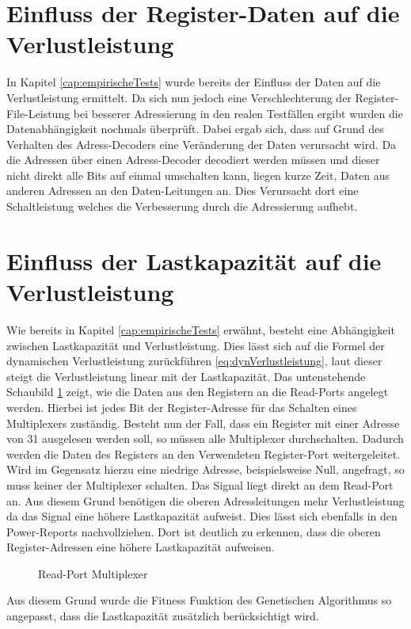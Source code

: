  


\section{Einfluss der Register-Daten auf die Verlustleistung}
In Kapitel \ref{cap:empirischeTests} wurde bereits der Einfluss der Daten auf die Verlustleistung ermittelt. Da sich nun jedoch eine Verschlechterung der Register-File-Leistung bei besserer Adressierung in den realen Testfällen ergibt wurden die Datenabhängigkeit nochmals überprüft. Dabei ergab sich, dass auf Grund des Verhalten des Adress-Decoders eine Veränderung der Daten verursacht wird. Da die Adressen über einen Adress-Decoder decodiert werden müssen und dieser nicht direkt alle Bits auf einmal umschalten kann, liegen kurze Zeit, Daten aus anderen Adressen an den Daten-Leitungen an. Dies Verursacht dort eine Schaltleistung welches die Verbesserung durch die Adressierung aufhebt.
%

\section{Einfluss der Lastkapazität  auf die Verlustleistung}
 \label{cap:lastkapa}
Wie bereits in Kapitel \ref{cap:empirischeTests} erwähnt, besteht eine Abhängigkeit zwischen Lastkapazität und Verlustleistung. Dies lässt sich auf die Formel der dynamischen Verlustleistung zurückführen \ref{eq:dynVerlustleistung}, laut dieser steigt die Verlustleistung linear mit der Lastkapazität.
Das untenstehende Schaubild \ref{fig:read_port_mux} zeigt, wie die Daten aus den Registern an die Read-Ports angelegt werden. Hierbei ist jedes Bit der Register-Adresse für das Schalten eines Multiplexers zuständig. Besteht nun der Fall, dass ein Register mit einer Adresse von 31 ausgelesen werden soll, so müssen alle Multiplexer durchschalten. Dadurch werden die Daten des Registers an den Verwendeten Register-Port weitergeleitet. Wird im Gegensatz hierzu eine niedrige Adresse, beispielsweise Null, angefragt, so muss keiner der Multiplexer schalten. Das Signal liegt direkt an dem Read-Port an. Aus diesem Grund benötigen die oberen Adressleitungen mehr Verlustleistung da das Signal eine höhere Lastkapazität aufweist. Dies lässt sich ebenfalls in den Power-Reports nachvollziehen. Dort ist deutlich zu erkennen, dass die oberen Register-Adressen eine höhere Lastkapazität aufweisen. 
\begin{scriptsize}
	\begin{figure}[htbp] 
		\centering
		
		\caption{Read-Port Multiplexer}
		\label{fig:read_port_mux}
	\end{figure}
\end{scriptsize}

Aus diesem Grund wurde die Fitness Funktion des Genetischen Algorithmus so angepasst, dass die Lastkapazität zusätzlich berücksichtigt wird.
